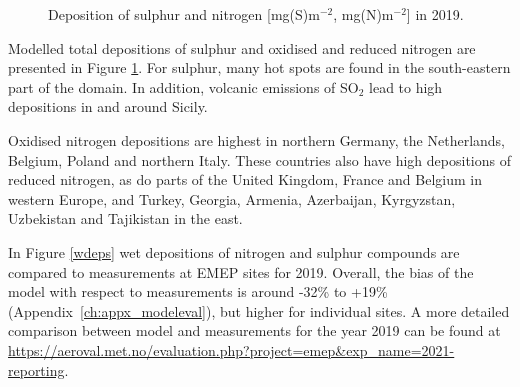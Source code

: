 \begin{figure}[H]
 \caption{Deposition of sulphur and nitrogen [mg(S)m$^{-2}$, mg(N)m$^{-2}$] in 2019.}
\label{deps}
\end{figure}

Modelled total depositions of sulphur and oxidised and reduced nitrogen are presented in Figure \ref{deps}.
For sulphur, many hot spots are found in the south-eastern part of the domain. In addition, volcanic emissions of SO$_2$ lead to high depositions in and around Sicily.

Oxidised nitrogen depositions are highest in northern Germany, the Netherlands, Belgium, Poland and northern Italy. These countries also have high depositions of reduced nitrogen, as do parts of the United Kingdom, France and Belgium in western Europe, and Turkey, Georgia, Armenia, Azerbaijan, Kyrgyzstan, Uzbekistan and Tajikistan in the east. 

In Figure \ref{wdeps} wet depositions of nitrogen and sulphur compounds are compared to measurements at EMEP sites for 2019. Overall, the bias of the model with respect to measurements is around 
-32\% to +19\% (Appendix~\ref{ch:appx_modeleval}), but higher for individual sites. A more detailed comparison between model and measurements for the year 2019 can be found at \url{https://aeroval.met.no/evaluation.php?project=emep&exp_name=2021-reporting}.

